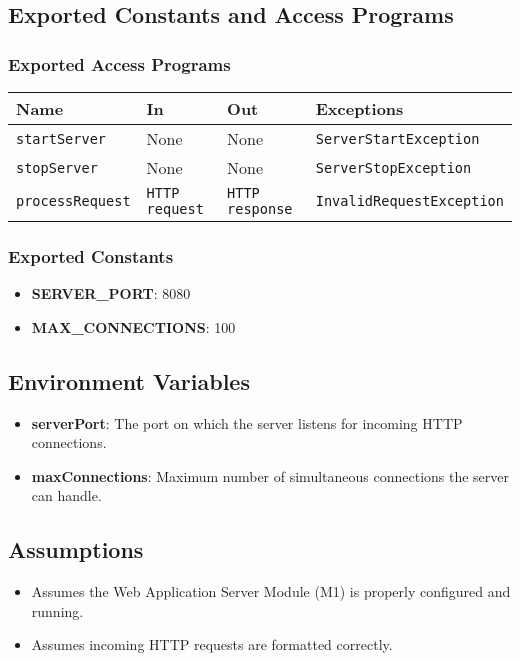 \documentclass[12pt, titlepage]{article}
\begin{document}
\subsection{Exported Constants and Access Programs}
\subsubsection{Exported Access Programs}
\begin{tabular}{|l|l|l|l|}
    \hline
    \textbf{Name} & \textbf{In} & \textbf{Out} & \textbf{Exceptions} \\
    \hline
    \texttt{startServer} & None & None & \texttt{ServerStartException} \\
    \texttt{stopServer} & None & None & \texttt{ServerStopException} \\
    \texttt{processRequest} & \texttt{HTTP request} & \texttt{HTTP response} & \texttt{InvalidRequestException} \\
    \hline
\end{tabular}

\subsubsection{Exported Constants}
\begin{itemize}
    \item \textbf{SERVER\_PORT}: 8080
    \item \textbf{MAX\_CONNECTIONS}: 100
\end{itemize}

\subsection{Environment Variables}
\begin{itemize}
    \item \textbf{serverPort}: The port on which the server listens for incoming HTTP connections.
    \item \textbf{maxConnections}: Maximum number of simultaneous connections the server can handle.
\end{itemize}

\subsection{Assumptions}
\begin{itemize}
    \item Assumes the Web Application Server Module (M1) is properly configured and running.
    \item Assumes incoming HTTP requests are formatted correctly.
\end{itemize}
\end{document}
